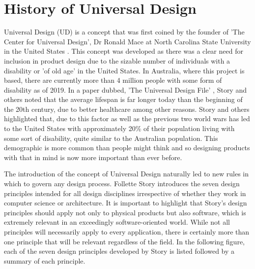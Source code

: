\section{History of Universal Design}
Universal Design (UD) is a concept that was first coined by the founder of 'The Center for Universal Design', Dr Ronald Mace at North Carolina State University in the United States \cite{ronald}.
This concept was developed as there was a clear need for inclusion in product design due to the sizable number of individuals with a disability or 'of old age' in the United States.
In Australia, where this project is based, there are currently more than 4 million people with some form of disability \cite{ausstats} as of 2019. 
In a paper dubbed, 'The Universal Design File' \cite{universalfile}, Story and others noted that the average lifespan is far longer today than the beginning of the 20th century, due to better healthcare among other reasons.
Story and others highlighted that, due to this factor as well as the previous two world wars has led to the United States with approximately 20\% of their population living with some sort of disability, quite similar to the Australian population.
This demographic is more common than people might think and so designing products with that in mind is now more important than ever before.

The introduction of the concept of Universal Design naturally led to new rules in which to govern any design process. %
Follette Story introduces the seven design principles \cite{sevenprinciples} intended for all design disciplines irrespective of whether they work in computer science or architecture.
It is important to highlight that Story's design principles should apply not only to physical products but also software, which is extremely relevant in an exceedingly software-oriented world.
While not all principles will necessarily apply to every application, there is certainly more than one principle that will be relevant regardless of the field.
In the following figure, each of the seven design principles developed by Story is listed followed by a summary of each principle.

